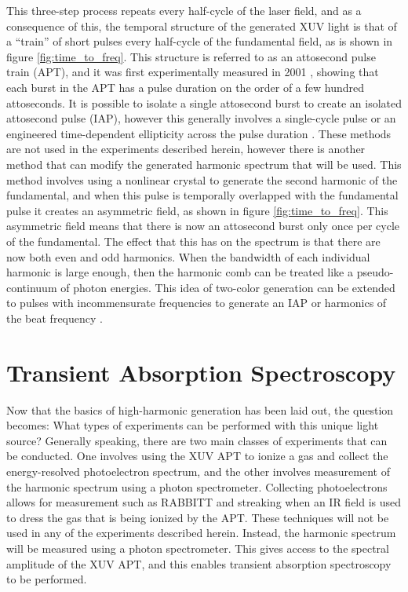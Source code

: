 This three-step process repeats every half-cycle of the laser field, and as a consequence of this, the temporal structure of the generated XUV light is that of a ``train'' of short pulses every half-cycle of the fundamental field, as is shown in figure \ref{fig:time_to_freq}.  This structure is referred to as an attosecond pulse train (APT),  and it was first experimentally measured in 2001 \cite{paulObservationTrainAttosecond2001}, showing that each burst in the APT has a pulse duration on the order of a few hundred attoseconds.  It is possible to isolate a single attosecond burst to create an isolated attosecond pulse (IAP), however this generally involves a single-cycle pulse \cite{hentschelAttosecondMetrology2001} or an engineered time-dependent ellipticity across the pulse duration \cite{mashikoDoubleOpticalGating2008}.  These methods are not used in the experiments described herein, however there is another method that can modify the generated harmonic spectrum that will be used.  This method involves using a nonlinear crystal to generate the second harmonic of the fundamental, and when this pulse is temporally overlapped with the fundamental pulse it creates an asymmetric field, as shown in figure \ref{fig:time_to_freq}.  This asymmetric field means that there is now an attosecond burst only once per cycle of the fundamental.  The effect that this has on the spectrum is that there are now both even and odd harmonics.  When the bandwidth of each individual harmonic is large enough, then the harmonic comb can be treated like a pseudo-continuum of photon energies.  This idea of two-color generation can be extended to pulses with incommensurate frequencies to generate an IAP or harmonics of the beat frequency \cite{takahashiInfraredTwoColorMulticycle2010, haesslerEnhancedMulticolourGating2015}.



\section{Transient Absorption Spectroscopy}
\label{sec:intro_transient_absorption}

Now that the basics of high-harmonic generation has been laid out, the question becomes: What types of experiments can be performed with this unique light source?  Generally speaking, there are two main classes of experiments that can be conducted.  One involves using the XUV APT to ionize a gas and collect the energy-resolved photoelectron spectrum, and the other involves measurement of the harmonic spectrum using a photon spectrometer.  Collecting photoelectrons allows for measurement such as RABBITT \cite{paulObservationTrainAttosecond2001} and streaking \cite{hentschelAttosecondMetrology2001} when an IR field is used to dress the gas that is being ionized  by the APT.  These techniques will not be used in any of the experiments described herein.  Instead, the harmonic spectrum will be measured using a photon spectrometer.  This gives access to the spectral amplitude of the XUV APT, and this enables transient absorption spectroscopy to be performed.

